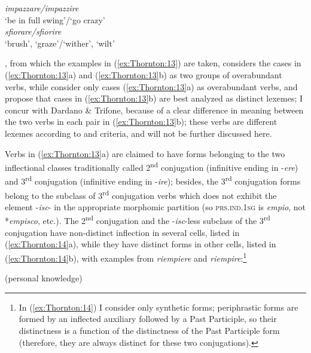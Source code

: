\documentclass[output=paper]{langsci/langscibook}
\begin{document}
\ex \emph{impazzare\slash{}impazzire} \\
\glt `be in full swing'\slash{}`go crazy'\\

\ex \emph{sfiorare\slash{}sfiorire} \\
\glt `brush', `graze'\slash{}`wither', `wilt'\\

\z
\z
\z

%
\citet{Serianni1988}%
%
, from which the examples in (\ref{ex:Thornton:13}) are taken, considers
the cases in (\ref{ex:Thornton:13}a) and (\ref{ex:Thornton:13}b) as two groups of overabundant verbs, while
%
\citet{DardanoTrifone1985} %
%
consider only cases (\ref{ex:Thornton:13}a) as overabundant
verbs, and propose that cases in (\ref{ex:Thornton:13}b) are best analyzed as distinct
lexemes; I concur with Dardano \& Trifone, because of a clear difference
in meaning between the two verbs in each pair in (\ref{ex:Thornton:13}b); these verbs are
different lexemes according to  and 
criteria, and will not be further discussed here.

Verbs in (\ref{ex:Thornton:13}a) are claimed to have forms belonging to the two
inflectional classes traditionally called 2\textsuperscript{nd}
conjugation (infinitive ending in -\emph{ere}) and 3\textsuperscript{rd}
conjugation (infinitive ending in -\emph{ire}); besides, the
3\textsuperscript{rd} conjugation forms belong to the subclass of
3\textsuperscript{rd} conjugation verbs which does not exhibit the
element -\emph{isc}- in the appropriate morphomic partition (so
\textsc{prs.ind.1sg} is \emph{empio}, not *\emph{empisco}, etc.). The
2\textsuperscript{nd} conjugation and the -\emph{isc}-less subclass of
the 3\textsuperscript{rd} conjugation have non-distinct inflection in
several cells, listed in (\ref{ex:Thornton:14}a), while they have distinct forms in other
cells, listed in (\ref{ex:Thornton:14}b), with examples from \emph{riempiere} and
\emph{riempire}:\footnote{In (\ref{ex:Thornton:14}) I consider only synthetic forms;
  periphrastic forms are formed by an inflected auxiliary followed by a
  Past Participle, so their distinctness is a function of the
  distinctness of the Past Participle form (therefore, they are always
  distinct for these two conjugations).}

\ea\label{ex:Thornton:14}  (personal knowledge)
\end{document}
